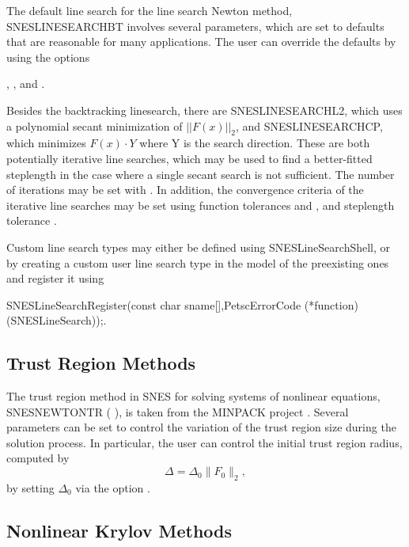 The default line search for the line search Newton method, SNESLINESEARCHBT involves several parameters, which are set
to defaults that are reasonable for many applications.  The user can override the defaults by using the options

, 
, and 
. 

Besides the backtracking linesearch, there are SNESLINESEARCHL2, which uses a polynomial secant minimization of
$||F(x)||_2$, and SNESLINESEARCHCP, which minimizes $F(x) \cdot Y$ where Y is the search direction.  These are both
potentially iterative line searches, which may be used to find a better-fitted steplength in the case where a single
secant search is not sufficient.  The number of iterations may be set with .  In addition,
the convergence criteria of the iterative line searches may be set using function tolerances 
and , and steplength tolerance .

Custom line search types may either be defined using SNESLineSearchShell, or by creating a custom user line search type
in the model of the preexisting ones and register it using
\begin{tabbing}
SNESLineSearchRegister(const char sname[],PetscErrorCode (*function)(SNESLineSearch));.
\end{tabbing}

\subsection{Trust Region Methods}

The trust region method in SNES for solving systems of nonlinear
equations, SNESNEWTONTR ( ), is taken from
the MINPACK project \cite{more84}. Several parameters can be set to
control the variation of the trust region size during the solution
process.  In particular, the user can control the initial trust region
radius, computed by
\[
  \Delta = \Delta_0 \| F_0 \|_2,
\]
by setting $ \Delta_0 $ via the option
.

\subsection{Nonlinear Krylov Methods}


